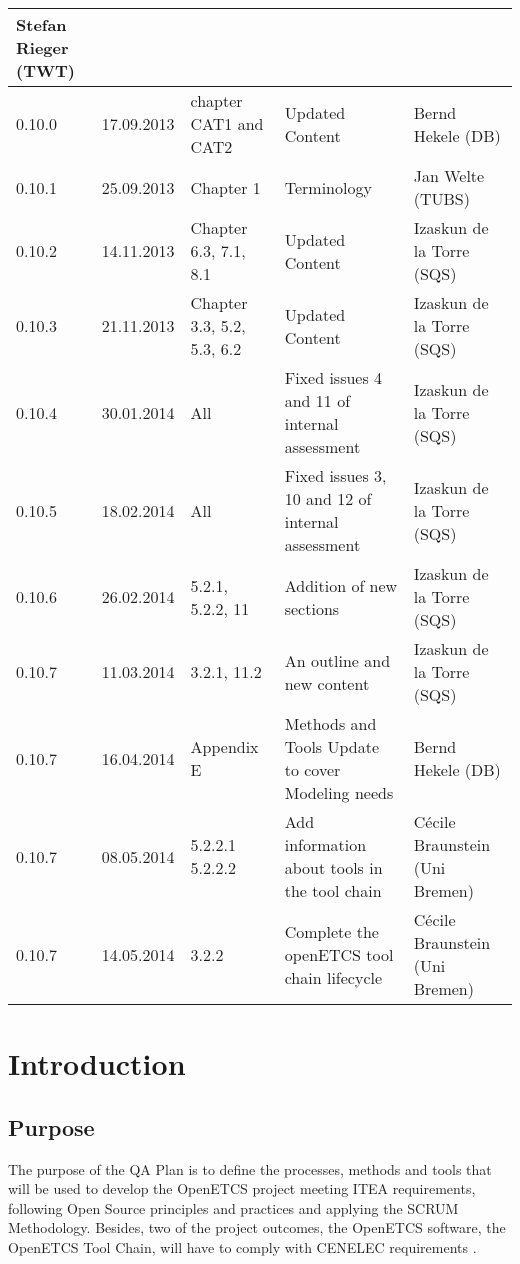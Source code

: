 \documentclass{template/openetcs_article}
\begin{document}
\begin{center}
\begin{longtable}{m{1.1cm}m{1.8cm}m{2cm}m{5cm}m{4cm}}
Stefan Rieger (TWT)\\\hline
0.10.0 &
17.09.2013 &
chapter CAT1 and CAT2 &
Updated Content  &
Bernd Hekele (DB)
\\\hline
0.10.1 &
25.09.2013 &
Chapter 1 &
Terminology &
Jan Welte (TUBS)
\\\hline
0.10.2 &
14.11.2013 &
Chapter 6.3, 7.1, 8.1 &
Updated Content &
Izaskun de la Torre (SQS)
\\\hline
0.10.3 &
21.11.2013 &
Chapter 3.3, 5.2, 5.3, 6.2 &
Updated Content &
Izaskun de la Torre (SQS)
\\\hline
0.10.4 &
30.01.2014 &
All &
Fixed issues 4 and 11 of internal assessment &
Izaskun de la Torre (SQS)
\\\hline
0.10.5 &
18.02.2014 &
All &
Fixed issues 3, 10 and 12 of internal assessment &
Izaskun de la Torre (SQS)
\\\hline
0.10.6 &
26.02.2014 &
5.2.1, 5.2.2, 11 &
Addition of new sections &
Izaskun de la Torre (SQS)
\\\hline
0.10.7 &
11.03.2014 &
3.2.1, 11.2 &
An outline and new content &
Izaskun de la Torre (SQS)
\\\hline
0.10.7 &
16.04.2014 &
Appendix E &
Methods and Tools Update to cover Modeling needs &
Bernd Hekele (DB)
\\\hline
0.10.7 &
08.05.2014 &
5.2.2.1 5.2.2.2 &
Add information about tools in the tool chain &
C\'ecile Braunstein (Uni Bremen)
\\\hline
0.10.7 &
14.05.2014 &
3.2.2 &
Complete the  openETCS tool chain lifecycle &
C\'ecile Braunstein (Uni Bremen)

\end{longtable}
\end{center}


\newpage



\section[Introduction]{Introduction}


\subsection{Purpose}

The purpose of the QA Plan is to define the processes, methods and tools that will be used to develop the OpenETCS project meeting ITEA requirements, following Open Source principles and practices and applying the SCRUM Methodology. Besides, two of the project outcomes, the OpenETCS software, the OpenETCS Tool Chain, will have to comply with CENELEC requirements \citep{EN50128}.
\end{document}
